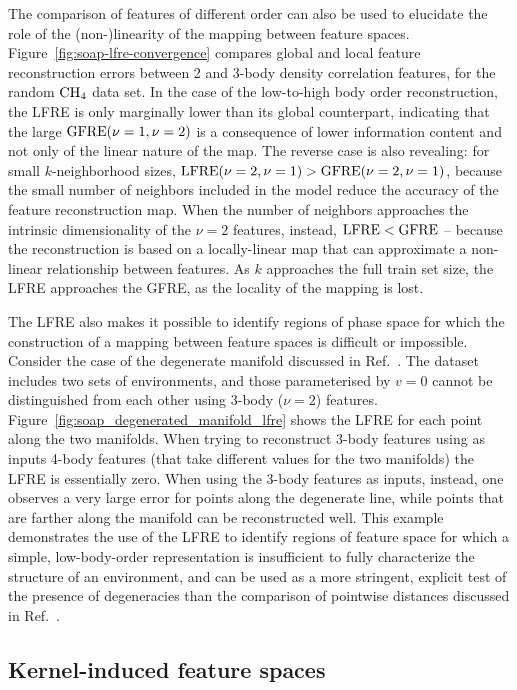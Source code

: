 The comparison of features of different order can also be used to elucidate the role of the (non-)linearity of the mapping between feature spaces. Figure~\ref{fig:soap-lfre-convergence} compares global and local feature reconstruction errors between 2 and 3-body density correlation features, for the random $\ce{CH4}$ data set. In the case of the low-to-high body order reconstruction, the LFRE is only marginally lower than its global counterpart, indicating that the large $\operatorname{GFRE}(\nu=1,\nu=2)$ is a consequence of lower information content and not only of the linear nature of the map. The reverse case is also revealing: for small $k$-neighborhood sizes, $\operatorname{LFRE}(\nu=2,\nu=1)>\operatorname{GFRE}(\nu=2,\nu=1)$, because the small number of neighbors included in the model reduce the accuracy of the feature reconstruction map. When the number of neighbors approaches the intrinsic dimensionality of the $\nu=2$ features, instead, $\operatorname{LFRE}<\operatorname{GFRE}$ -- because the reconstruction is based on a locally-linear map that can approximate a non-linear relationship between features. As $k$ approaches the full train set size, the LFRE approaches the GFRE, as the locality of the mapping is lost. 

The LFRE also makes it possible to identify regions of phase space for which the construction of a mapping between feature spaces is difficult or impossible. 
Consider the case of the degenerate manifold discussed in Ref.~. The dataset includes two sets of  environments, and those parameterised by $v=0$ cannot be distinguished from each other using 3-body ($\nu=2$) features.
Figure~\ref{fig:soap_degenerated_manifold_lfre} shows the LFRE for each point along the two manifolds. When trying to reconstruct 3-body features using as inputs 4-body features (that take different values for the two manifolds) the LFRE is essentially zero. When using the 3-body features as inputs, instead, one observes a very large error for points along the degenerate line, while points that are farther along the manifold can be reconstructed well. This example demonstrates the use of the LFRE to identify regions of feature space for which a simple, low-body-order representation is insufficient to fully characterize the structure of an environment, and can be used as a more stringent, explicit test of the presence of degeneracies than the comparison of pointwise distances discussed in Ref.~. 

\subsection{Kernel-induced feature spaces}

